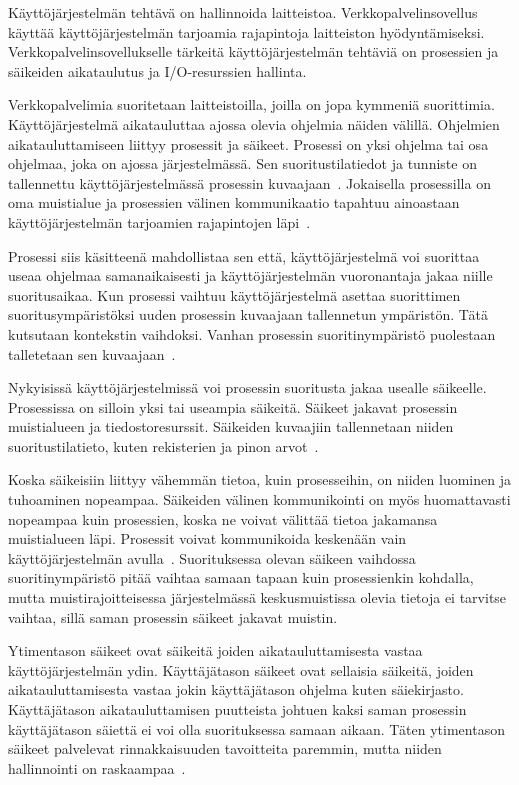 \documentclass[finnish]{tktltiki2}
\theoremstyle{definition}
\theoremstyle{remark}
\begin{document}
Käyttöjärjestelmän tehtävä on hallinnoida laitteistoa.
Verkkopalvelinsovellus käyttää käyttöjärjestelmän
tarjoamia rajapintoja laitteiston hyödyntämiseksi.
Verkkopalvelinsovellukselle tärkeitä
käyttöjärjestelmän tehtäviä on 
prosessien ja säikeiden aikataulutus ja I/O-resurssien hallinta.

Verkkopalvelimia suoritetaan laitteistoilla, joilla
on jopa kymmeniä suorittimia. Käyttöjärjestelmä
aikatauluttaa ajossa olevia ohjelmia näiden välillä.
Ohjelmien aikatauluttamiseen liittyy prosessit ja säikeet.
Prosessi on yksi ohjelma tai osa ohjelmaa, joka on ajossa järjestelmässä.
Sen suoritustilatiedot ja tunniste on
tallennettu käyttöjärjestelmässä prosessin kuvaajaan~\cite{stallings_operating_2018}.
Jokaisella
prosessilla on oma muistialue ja prosessien välinen kommunikaatio
tapahtuu ainoastaan käyttöjärjestelmän tarjoamien
rajapintojen läpi~\cite{stallings_operating_2018}.

Prosessi siis käsitteenä mahdollistaa sen että, käyttöjärjestelmä
voi suorittaa useaa ohjelmaa samanaikaisesti ja käyttöjärjestelmän
vuoronantaja jakaa niille suoritusaikaa. Kun prosessi vaihtuu
käyttöjärjestelmä asettaa suorittimen suoritusympäristöksi
uuden prosessin kuvaajaan tallennetun ympäristön. Tätä kutsutaan kontekstin
vaihdoksi. Vanhan prosessin suoritinympäristö puolestaan talletetaan sen
kuvaajaan~\cite{stallings_operating_2018}.

Nykyisissä käyttöjärjestelmissä voi prosessin suoritusta jakaa usealle
säikeelle. Prosessissa on silloin yksi tai useampia säikeitä.
Säikeet jakavat prosessin muistialueen ja tiedostoresurssit.
Säikeiden kuvaajiin
tallennetaan niiden suoritustilatieto,
kuten rekisterien ja pinon arvot~\cite{stallings_operating_2018}.

Koska säikeisiin liittyy vähemmän tietoa, kuin prosesseihin,
on niiden luominen ja tuhoaminen nopeampaa. Säikeiden välinen
kommunikointi on myös huomattavasti nopeampaa kuin prosessien, koska
ne voivat välittää tietoa jakamansa muistialueen läpi.
Prosessit voivat kommunikoida keskenään vain käyttöjärjestelmän
avulla~\cite{stallings_operating_2018}.
Suorituksessa olevan säikeen
vaihdossa suoritinympäristö pitää vaihtaa
samaan tapaan kuin prosessienkin kohdalla, mutta muistirajoitteisessa
järjestelmässä keskusmuistissa olevia
tietoja ei tarvitse vaihtaa, sillä saman prosessin säikeet jakavat
muistin.

Ytimentason säikeet ovat säikeitä joiden aikatauluttamisesta vastaa
käyttöjärjestelmän ydin. Käyttäjätason säikeet ovat sellaisia säikeitä,
joiden aikatauluttamisesta vastaa jokin käyttäjätason ohjelma kuten
säiekirjasto. Käyttäjätason aikatauluttamisen puutteista johtuen
kaksi saman prosessin käyttäjätason säiettä ei voi olla suorituksessa
samaan aikaan. Täten ytimentason säikeet palvelevat rinnakkaisuuden tavoitteita
paremmin, mutta niiden hallinnointi on raskaampaa~\cite{stallings_operating_2018}.
\end{document}
